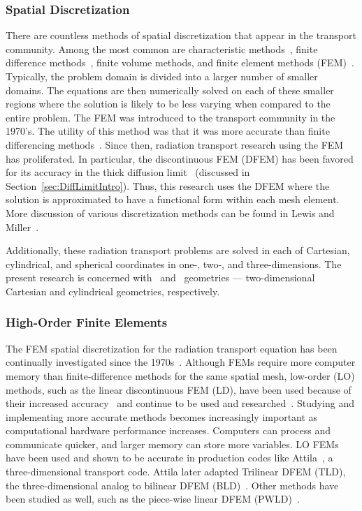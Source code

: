 \documentclass[12pt,letterpaper]{article}
\begin{document}
\subsubsection{Spatial Discretization}
\label{subsec:SpatialDiscretization}
There are countless methods of spatial discretization that appear in the transport community. Among the most common are characteristic methods~\cite{AdamsCharacteristicMethods}, finite difference methods~\cite{Lewis_Comp_Methods_Neu_Trans}, finite volume methods, and finite element methods (FEM)~\cite{Lewis_Comp_Methods_Neu_Trans}. Typically, the problem domain is divided into a larger number of smaller domains. The equations are then numerically solved on each of these smaller regions where the solution is likely to be less varying when compared to the entire problem. The FEM was introduced to the transport community in the 1970's. The utility of this method was that it was more accurate than finite differencing methods~\cite{ReedTriangularMesh}. Since then, radiation transport research using the FEM has proliferated. In particular, the discontinuous FEM (DFEM) has been favored for its accuracy in the thick diffusion limit~\cite{LarsenAsymptotic} (discussed in Section~\ref{sec:DiffLimitIntro}). Thus, this research uses the DFEM where the solution is approximated to have a functional form within each mesh element. More discussion of various discretization methods can be found in Lewis and Miller~\cite{Lewis_Comp_Methods_Neu_Trans}.

Additionally, these radiation transport problems are solved in each of Cartesian, cylindrical, and spherical coordinates in one-, two-, and three-dimensions. The present research is concerned with \XY\ and \RZ\ geometries ---  two-dimensional Cartesian and cylindrical geometries, respectively.

\subsubsection{High-Order Finite Elements}
\label{sec:HODFEMIntro}
The FEM spatial discretization for the radiation transport equation has been continually investigated since the 1970s~\cite{ReedTriangularMesh, LasaintFEM}. Although FEMs require more computer memory than finite-difference methods for the same spatial mesh, low-order (LO) methods, such as the linear discontinuous FEM (LD), have been used because of their increased accuracy~\cite{LarsenAsymptotic} and continue to be used and researched~\cite{LarsenConvergenceRates,HamiltonNegativeFluxFixups,Adams_Disc_FEM_Thick_Diff}. Studying and implementing more accurate methods becomes increasingly important as computational hardware performance increases. Computers can process and communicate quicker, and larger memory can store more variables. LO FEMs have been used and shown to be accurate in production codes like Attila~\cite{WareingAttila}, a three-dimensional transport code. Attila later adapted Trilinear DFEM (TLD), the three-dimensional analog to bilinear DFEM (BLD)~\cite{AttilaUsersManual}. Other methods have been studied as well, such as the piece-wise linear DFEM (PWLD)~\cite{BaileyDFEMCylindrical}.
\end{document}
